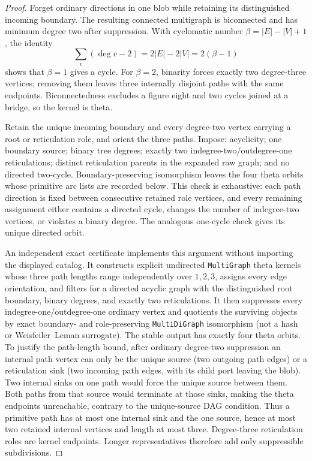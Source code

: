 \documentclass[11pt]{article}
\begin{document}
\begin{proof}
Forget ordinary directions in one blob while retaining its distinguished
incoming boundary.  The resulting connected multigraph is biconnected and has
minimum degree two after suppression.  With cyclomatic number
$\beta=|E|-|V|+1$, the identity
\[
 \sum_v(\deg v-2)=2|E|-2|V|=2(\beta-1)
\]
shows that $\beta=1$ gives a cycle.  For $\beta=2$, binarity forces exactly two
degree-three vertices; removing them leaves three internally disjoint paths
with the same endpoints.  Biconnectedness excludes a figure eight and two
cycles joined at a bridge, so the kernel is theta.

Retain the unique incoming boundary and every degree-two vertex carrying a
root or reticulation role, and orient the three paths.  Impose: acyclicity; one
boundary source; binary tree degrees; exactly two indegree-two/outdegree-one
reticulations; distinct reticulation parents in the expanded raw graph; and no
directed two-cycle.  Boundary-preserving isomorphism leaves the four theta
orbits whose primitive arc lists are recorded below.  This check is exhaustive:
each path direction is fixed between consecutive retained role vertices, and
every remaining assignment either contains a directed cycle, changes the
number of indegree-two vertices, or violates a binary degree.  The analogous
one-cycle check gives its unique directed orbit.

An independent exact certificate implements this argument without importing
the displayed catalog.  It constructs explicit undirected
\texttt{MultiGraph} theta kernels whose three path lengths range independently
over $1,2,3$, assigns every edge orientation, and filters for a directed
acyclic graph with the distinguished root boundary, binary degrees, and
exactly two reticulations.  It then suppresses every
indegree-one/outdegree-one ordinary vertex and quotients the surviving objects
by exact boundary- and role-preserving \texttt{MultiDiGraph} isomorphism (not a
hash or Weisfeiler--Leman surrogate).  The stable output has exactly four
theta orbits.  To justify the path-length bound, after ordinary degree-two suppression an internal path vertex can only be the unique source (two outgoing path edges) or a reticulation sink (two incoming path edges, with its child port leaving the blob). Two internal sinks on one path would force the unique source between them. Both paths from that source would terminate at those sinks, making the theta endpoints unreachable, contrary to the unique-source DAG condition. Thus a primitive path has at most one internal sink and the one source, hence at most two retained internal vertices and length at most three. Degree-three reticulation roles are kernel endpoints. Longer representatives therefore add only suppressible subdivisions.


\end{proof}
\end{document}
